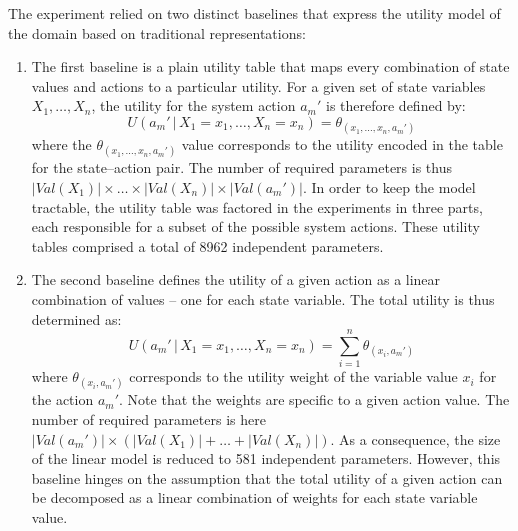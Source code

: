 The experiment relied on two distinct baselines that express the utility model of the domain based on traditional representations: \begin{enumerate}
\item The first baseline is a plain utility table that maps every combination of state values and actions to a particular utility.  For a given set of state variables $X_1, \dots, X_n$, 
the utility for the system action $a_m'$ is therefore defined by: 
\begin{equation}
U(a_m' \, | \, X_1\!=\!x_1, \dots, X_n\!=\!x_n) = \theta_{(x_1, \dots, x_n, a_m')}
\end{equation}
where the $\theta_{(x_1, \dots, x_n, a_m')}$ value corresponds to the utility encoded in the table for the state--action pair. The number of required parameters is thus $|\mathit{Val}(X_1)| \times \dots \times |\mathit{Val}(X_n)| \times |\mathit{Val}(a_m')|$. In order to keep the model tractable, the utility table was factored in the experiments in three parts, each responsible for a subset of the possible system actions. These utility tables comprised a total of 8962 independent parameters. 
\item The second baseline defines the utility of a given action as a linear combination of values -- one for each state variable.  The total utility is thus determined as:
\begin{equation}
U(a_m' \, | \, X_1\!=\!x_1, \dots, X_n\!=\!x_n) = \sum_{i=1}^{n} \theta_{(x_i, a_m')}
\end{equation}
where $\theta_{(x_i, a_m')}$ corresponds to the utility weight of the variable value $x_i$ for the action $a_m'$.  Note that the weights are specific to a given action value. The number of required parameters is here $|\mathit{Val}(a_m')| \times (|\mathit{Val}(X_1)| + \dots + |\mathit{Val}(X_n)|)$.  As a consequence, the size of the linear model is reduced to 581 independent parameters.  However, this baseline hinges on the assumption that the total utility of a given action can be decomposed as a linear combination of weights for each state variable value.
\end{enumerate}

